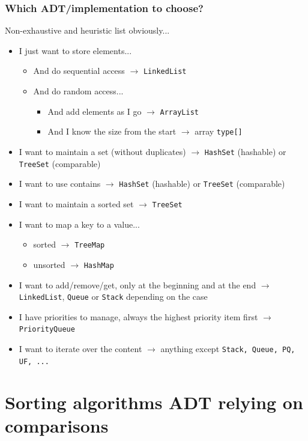 \documentclass[8pt,aspectratio=169]{beamer}
\begin{document}
\begin{frame}
\frametitle{Which ADT/implementation to choose?}
\color{red} Non-exhaustive and heuristic list obviously...
\begin{itemize}
	\item I just want to store elements...
		\begin{itemize}
			\item And do sequential access $\rightarrow$ \texttt{LinkedList}
			\item And do random access...
				\begin{itemize}
					\item And add elements as I go $\rightarrow$ \texttt{ArrayList}
					\item And I know the size from the start $\rightarrow$ array \texttt{type[]}
				\end{itemize}
		\end{itemize}
	\item I want to maintain a set (without duplicates) $\rightarrow$ \texttt{HashSet} (hashable) or \texttt{TreeSet} (comparable)
	\item I want to use contains $\rightarrow$ \texttt{HashSet} (hashable) or \texttt{TreeSet} (comparable)
	\item I want to maintain a sorted set $\rightarrow$ \texttt{TreeSet}
	\item I want to map a key to a value...
		\begin{itemize}
			\item sorted $\rightarrow$ \texttt{TreeMap}
			\item unsorted $\rightarrow$ \texttt{HashMap}
		\end{itemize}
	\item I want to add/remove/get, only at the beginning and at the end $\rightarrow$ \texttt{LinkedList}, \texttt{Queue} or \texttt{Stack} depending on the case
	\item I have priorities to manage, always the highest priority item first $\rightarrow$ \texttt{PriorityQueue}
	\item I want to iterate over the content $\rightarrow$ anything except \texttt{Stack, Queue, PQ, UF, ...}
\end{itemize}
\end{frame}


\section{Sorting algorithms ADT relying on comparisons}
\end{document}
